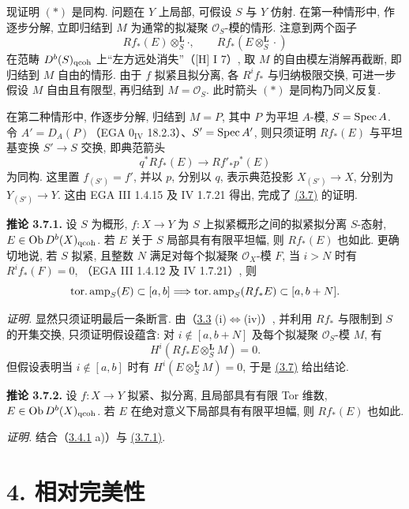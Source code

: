 现证明 \((*)\) 是同构. 问题在 \(Y\) 上局部, 可假设 \(S\) 与 \(Y\) 仿射. 在第一种情形中, 作逐步分解, 立即归结到 \(M\) 为通常的拟凝聚 \(\mathcal O_S\)-模的情形. 注意到两个函子
\[
Rf_*(E)\otimes_S^{\mathbf L}\cdot,
\qquad Rf_*(E\otimes_S^{\mathbf L}\cdot)
\]
在范畴 \(D^b(S)_{\mathrm{qcoh}}\) 上“左方远处消失”（[H] I 7）, 取 \(M\) 的自由模左消解再截断, 即归结到 \(M\) 自由的情形. 由于 \(f\) 拟紧且拟分离, 各 \(R^if_*\) 与归纳极限交换, 可进一步假设 \(M\) 自由且有限型, 再归结到 \(M=\mathcal O_S\). 此时箭头 \((*)\) 是同构乃同义反复.

在第二种情形中, 作逐步分解, 归结到 \(M=P\), 其中 \(P\) 为平坦 \(A\)-模, \(S=\operatorname{Spec} A\). 令 \(A'=D_A(P)\)（EGA \(0_{\mathrm{IV}}\) 18.2.3）、\(S'=\operatorname{Spec} A'\), 则只须证明 \(Rf_*(E)\) 与平坦基变换 \(S'\to S\) 交换, 即典范箭头
\[
q^*Rf_*(E)\longrightarrow Rf'_*p^*(E)
\]
为同构. 这里置 \(f_{(S')}=f'\), 并以 \(p\), 分别以 \(q\), 表示典范投影 \(X_{(S')}\to X\), 分别为 \(Y_{(S')}\to Y\). 这由 EGA III 1.4.15 及 IV 1.7.21 得出, 完成了 \hyperlink{sga6.e03.prop.3-7}{(3.7)} 的证明.

\textbf{推论 3.7.1.} 设 \(S\) 为概形, \(f:X\to Y\) 为 $S$ 上拟紧概形之间的拟紧拟分离 \(S\)-态射, \(E\in\operatorname{Ob} D^b(X)_{\mathrm{qcoh}}\). 若 \(E\) 关于 \(S\) 局部具有有限平坦幅, 则 \(Rf_*(E)\) 也如此. 更确切地说, 若 \(S\) 拟紧, 且整数 \(N\) 满足对每个拟凝聚 \(\mathcal O_X\)-模 \(F\), 当 \(i>N\) 时有 \(R^if_*(F)=0\), （EGA III 1.4.12 及 IV 1.7.21）, 则
\[
 \operatorname{tor.amp}_S(E)\subset[a,b]
 \Longrightarrow
 \operatorname{tor.amp}_S(Rf_*E)\subset[a,b+N].
\]

\emph{证明.} 显然只须证明最后一条断言. 由（\hyperlink{sga6.e03.prop.3-3}{3.3} (i)\(\Leftrightarrow\)(iv)）, 并利用 \(Rf_*\) 与限制到 \(S\) 的开集交换, 只须证明假设蕴含: 对 \(i\notin[a,b+N]\) 及每个拟凝聚 \(\mathcal O_S\)-模 \(M\), 有
\[
 H^i(Rf_*E\otimes_S^{\mathbf L}M)=0
.
\]
 但假设表明当 \(i\notin[a,b]\) 时有 \(H^i(E\otimes_S^{\mathbf L}M)=0\), 于是 \hyperlink{sga6.e03.prop.3-7}{(3.7)} 给出结论.

\textbf{推论 3.7.2.} 设 \(f:X\to Y\) 拟紧、拟分离, 且局部具有有限 Tor 维数, \(E\in\operatorname{Ob} D^b(X)_{\mathrm{qcoh}}\). 若 \(E\) 在绝对意义下局部具有有限平坦幅, 则 \(Rf_*(E)\) 也如此.

\emph{证明.} 结合（\hyperlink{sga6.e03.cor.3-4-1}{3.4.1} a)）与 \hyperlink{sga6.e03.cor.3-7-1}{(3.7.1)}.

\section*{4. 相对完美性}

